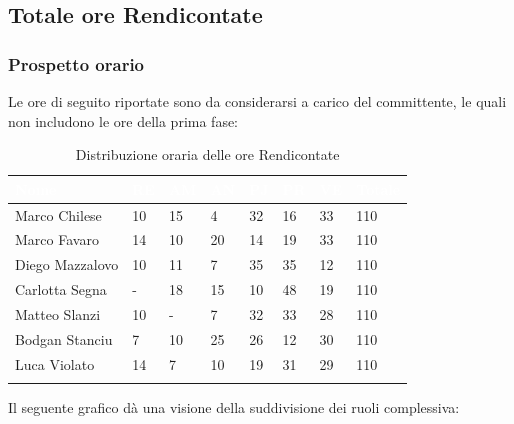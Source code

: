 \newpage

\subsection{Totale ore Rendicontate}
\label{PTRR}
\subsubsection{Prospetto orario}

Le ore di seguito riportate sono da considerarsi a carico del committente, le quali non includono le ore della prima fase:

\begin{longtable}{|C{.30\textwidth}|C{.06\textwidth}|C{.06\textwidth}|C{.06\textwidth} | C{.06\textwidth}| C{.06\textwidth} | C{.06\textwidth} | C{.10\textwidth} |}
\hline
{}	\textbf{\textcolor{white}{Nome}} & \textbf{\textcolor{white}{RE}} & \textbf{\textcolor{white}{AM}} & \textbf{\textcolor{white}{AN}} & \textbf{\textcolor{white}{PJ}} & \textbf{\textcolor{white}{PR}} & \textbf{\textcolor{white}{VE}} & \textbf{\textcolor{white}{Totale}}\\
\hline 
Marco Chilese & 10 & 15 & 4 & 32 & 16 & 33 & 110\\
\hline
{}Marco Favaro & 14 & 10 & 20 & 14 & 19 & 33 & 110\\
\hline
Diego Mazzalovo & 10 & 11 & 7 & 35 & 35 & 12 & 110\\
\hline
{}Carlotta Segna & - & 18 & 15 & 10 & 48 & 19 & 110\\
\hline
Matteo Slanzi & 10 & - & 7 & 32 & 33 & 28 & 110\\
\hline
{}Bodgan Stanciu & 7 & 10 & 25 & 26 & 12 & 30 & 110\\
\hline
Luca Violato & 14 & 7 & 10 & 19 & 31 & 29 & 110 \\
\hline

\caption{Distribuzione oraria delle ore Rendicontate}
\label{Distribuzione oraria delle ore rendicontate}
\end{longtable}

Il seguente grafico dà una visione della suddivisione dei ruoli complessiva:

